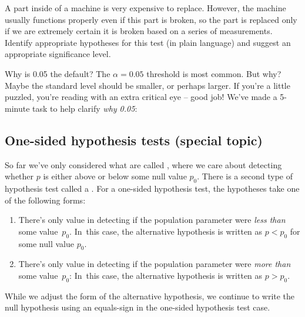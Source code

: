 \begin{exercisewrap}
\begin{nexercise}
A part inside of a machine is very expensive to replace.
However, the machine usually functions properly even if
this part is broken, so the part is replaced only if we
are extremely certain it is broken based on a series of
measurements.
Identify appropriate hypotheses for this test
(in plain language) and suggest an appropriate significance
level.\footnotemark
\end{nexercise}
\end{exercisewrap}

\begin{onebox}{Why is 0.05 the default?}
  The $\alpha = 0.05$ threshold is most common. But why?
  Maybe the standard level should be smaller, or perhaps larger.
  If you're a little puzzled, you're reading with an
  extra critical eye -- good job!
  We've made a 5-minute task to help clarify \emph{why 0.05}:
  \begin{center}
  \end{center}
\end{onebox}




\subsection{One-sided hypothesis tests (special topic)}

So far we've only considered what are called , where we care about detecting whether $p$
is either above or below some null value $p_0$.
There is a second type of hypothesis test called a
.
For a one-sided hypothesis test,
the hypotheses take one of the following forms:
\begin{enumerate}
\item There's only value in detecting if the population
    parameter were \emph{less than} some value~$p_0$.
    In~this case, the alternative hypothesis is written
    as $p < p_0$ for some null value $p_0$.
\item There's only value in detecting if the population
    parameter were \emph{more than} some value~$p_0$:
    In~this case, the alternative hypothesis is written
    as $p > p_0$.
\end{enumerate}
While we adjust the form of the alternative hypothesis,
we continue to write the null hypothesis using an equals-sign
in the one-sided hypothesis test case.

